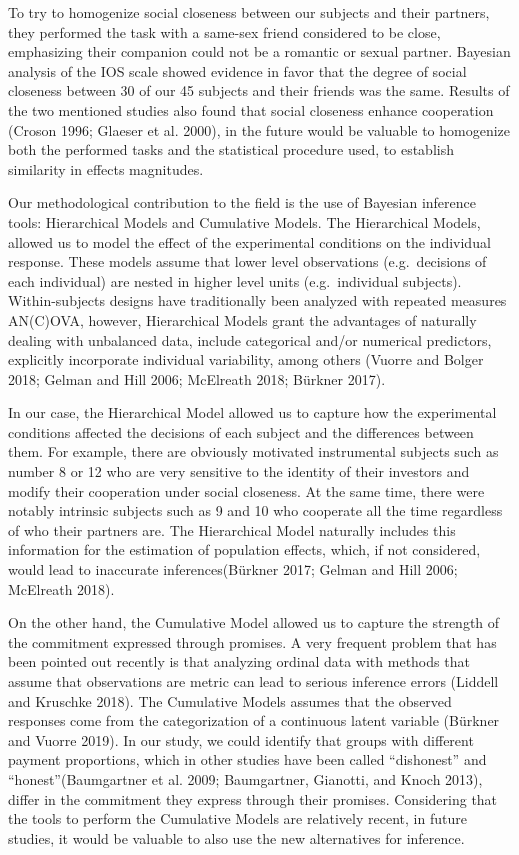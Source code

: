 \documentclass[smallextended]{svjour3}       %
\begin{document}
To try to homogenize social closeness between our subjects and their
partners, they performed the task with a same-sex friend considered to
be close, emphasizing their companion could not be a romantic or sexual
partner. Bayesian analysis of the IOS scale showed evidence in favor
that the degree of social closeness between 30 of our 45 subjects and
their friends was the same. Results of the two mentioned studies also
found that social closeness enhance cooperation (Croson 1996; Glaeser et
al. 2000), in the future would be valuable to homogenize both the
performed tasks and the statistical procedure used, to establish
similarity in effects magnitudes.

Our methodological contribution to the field is the use of Bayesian
inference tools: Hierarchical Models and Cumulative Models. The
Hierarchical Models, allowed us to model the effect of the experimental
conditions on the individual response. These models assume that lower
level observations (e.g.~decisions of each individual) are nested in
higher level units (e.g.~individual subjects). Within-subjects designs
have traditionally been analyzed with repeated measures AN(C)OVA,
however, Hierarchical Models grant the advantages of naturally dealing
with unbalanced data, include categorical and/or numerical predictors,
explicitly incorporate individual variability, among others (Vuorre and
Bolger 2018; Gelman and Hill 2006; McElreath 2018; Bürkner 2017).

In our case, the Hierarchical Model allowed us to capture how the
experimental conditions affected the decisions of each subject and the
differences between them. For example, there are obviously motivated
instrumental subjects such as number 8 or 12 who are very sensitive to
the identity of their investors and modify their cooperation under
social closeness. At the same time, there were notably intrinsic
subjects such as 9 and 10 who cooperate all the time regardless of who
their partners are. The Hierarchical Model naturally includes this
information for the estimation of population effects, which, if not
considered, would lead to inaccurate inferences(Bürkner 2017; Gelman and
Hill 2006; McElreath 2018).

On the other hand, the Cumulative Model allowed us to capture the
strength of the commitment expressed through promises. A very frequent
problem that has been pointed out recently is that analyzing ordinal
data with methods that assume that observations are metric can lead to
serious inference errors (Liddell and Kruschke 2018). The Cumulative
Models assumes that the observed responses come from the categorization
of a continuous latent variable (Bürkner and Vuorre 2019). In our study,
we could identify that groups with different payment proportions, which
in other studies have been called ``dishonest'' and
``honest''(Baumgartner et al. 2009; Baumgartner, Gianotti, and Knoch
2013), differ in the commitment they express through their promises.
Considering that the tools to perform the Cumulative Models are
relatively recent, in future studies, it would be valuable to also use
the new alternatives for inference.
\end{document}
